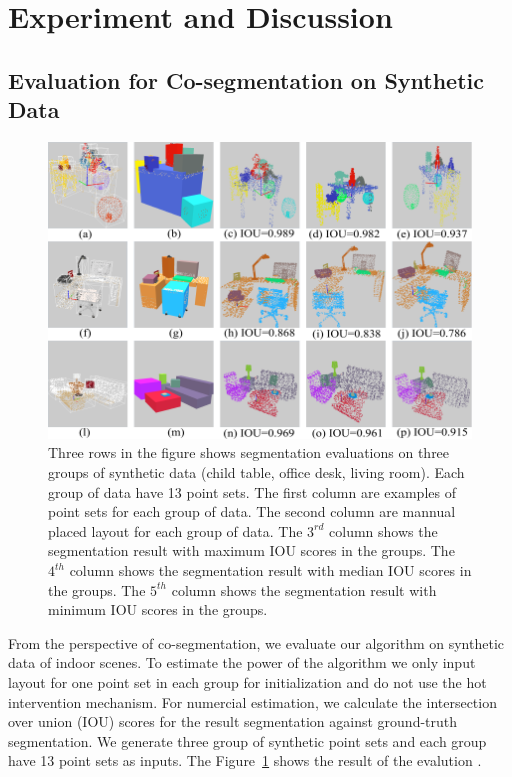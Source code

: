 \section{Experiment and Discussion}
\subsection{Evaluation for Co-segmentation on Synthetic Data}
\begin{figure}[htb]
	\centering
	\includegraphics[width=0.8\linewidth]{images/seg/seg}
	\caption{\label{fig:seg}Three rows in the figure shows segmentation evaluations on three groups of synthetic data (child table, office desk, living room). Each group of data have 13 point sets. The first column are examples of point sets for each group of data. The second column are mannual placed layout for each group of data. The $3^{rd}$ column shows the segmentation result with maximum IOU scores in the groups. The $4^{th}$ column shows the segmentation result with median IOU scores in the groups. The $5^{th}$ column shows the segmentation result with minimum IOU scores in the groups.}
\end{figure}
From the perspective of co-segmentation, we evaluate our algorithm on synthetic data of indoor scenes. To estimate the power of the algorithm we only input layout for one point set in each group for initialization and do not use the hot intervention mechanism. For numercial  estimation, we calculate the intersection over union (IOU) scores for the result segmentation against ground-truth segmentation. We generate three group of synthetic point sets and each group have 13 point sets as inputs. The Figure~\ref{fig:seg} shows the result of the evalution .


